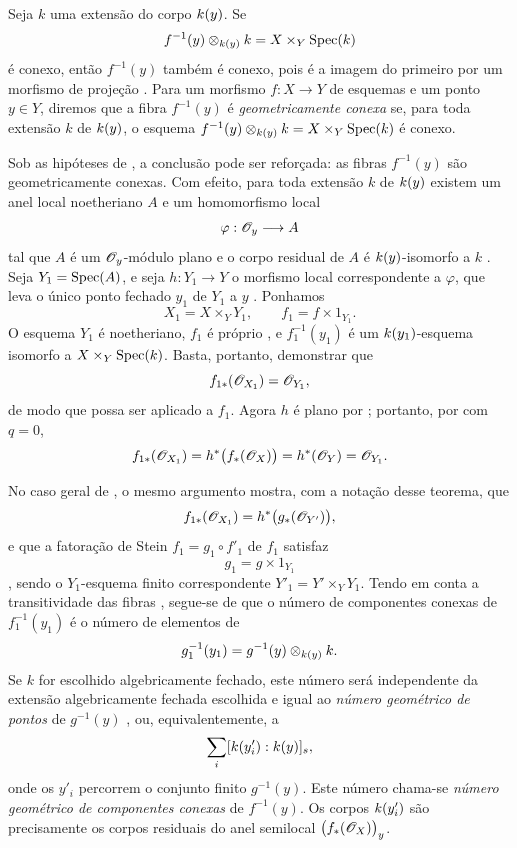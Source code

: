 \begin{remark}[4.3.4]
\label{III.4.3.4}
Seja $k$ uma extensão do corpo $k(y)$. Se
\[
  f^{-1}(y)\otimes_{k(y)}k
  =
  X\times_Y\operatorname{Spec}(k)
\]
é conexo, então $f^{-1}(y)$ também é conexo, pois é a imagem
do primeiro por um morfismo de projeção
. Para um morfismo $f:X\to Y$ de esquemas e um ponto
$y\in Y$, diremos que a fibra $f^{-1}(y)$ é
\emph{geometricamente conexa} se, para toda extensão $k$ de
$k(y)$, o esquema
$f^{-1}(y)\otimes_{k(y)}k=X\times_Y\operatorname{Spec}(k)$ é conexo.


Sob as hipóteses de , a conclusão pode
ser reforçada: as fibras $f^{-1}(y)$ são geometricamente conexas.
Com efeito, para toda extensão $k$ de $k(y)$ existem um anel
local noetheriano $A$ e um homomorfismo local
\[
  \varphi:\mathscr{O}_y\longrightarrow A
\]
tal que $A$ é um $\mathscr{O}_y$-módulo plano e o corpo residual de
$A$ é $k(y)$-isomorfo a $k$ .
Seja $Y_1=\operatorname{Spec}(A)$, e seja $h:Y_1\to Y$ o morfismo local
correspondente a $\varphi$, que leva o único ponto fechado $y_1$ de
$Y_1$ a $y$ . Ponhamos
\[
  X_1=X\times_Y Y_1,
  \qquad
  f_1=f\times 1_{Y_1}.
\]
O esquema $Y_1$ é noetheriano, $f_1$ é próprio
, e $f_1^{-1}(y_1)$ é um
$k(y_1)$-esquema isomorfo a $X\times_Y\operatorname{Spec}(k)$. Basta, portanto,
demonstrar que
\[
  f_{1*}(\mathscr{O}_{X_1})=\mathscr{O}_{Y_1},
\]
de modo que  possa ser aplicado a $f_1$. Agora $h$ é
plano por ; portanto, por  com
$q=0$,
\[
  f_{1*}(\mathscr{O}_{X_1})
  =
  h^*\bigl(f_*(\mathscr{O}_X)\bigr)
  =
  h^*(\mathscr{O}_Y)
  =
  \mathscr{O}_{Y_1}.
\]

No caso geral de , o mesmo argumento mostra,
com a notação desse teorema, que
\[
  f_{1*}(\mathscr{O}_{X_1})
  =
  h^*\bigl(g_*(\mathscr{O}_{Y'})\bigr),
\]
e que a fatoração de Stein $f_1=g_1\circ f'_1$ de $f_1$
satisfaz
\[
  g_1=g\times 1_{Y_1}
\]
, sendo o $Y_1$-esquema finito correspondente
$Y'_1=Y'\times_Y Y_1$. Tendo em conta a transitividade das
fibras , segue-se de
 que o número de componentes conexas de
$f_1^{-1}(y_1)$ é o número de elementos de
\[
  g_1^{-1}(y_1)
  =
  g^{-1}(y)\otimes_{k(y)}k.
\]
Se $k$ for escolhido algebricamente fechado, este número será independente
da extensão algebricamente fechada escolhida e igual ao
\emph{número geométrico de pontos} de $g^{-1}(y)$
, ou, equivalentemente, a
\[
  \sum_i[k(y'_i):k(y)]_s,
\]
onde os $y'_i$ percorrem o conjunto finito $g^{-1}(y)$. Este número
chama-se \emph{número geométrico de componentes conexas} de
$f^{-1}(y)$. Os corpos $k(y'_i)$ são precisamente os corpos
residuais do anel semilocal $\bigl(f_*(\mathscr{O}_X)\bigr)_y$.
\end{remark}

